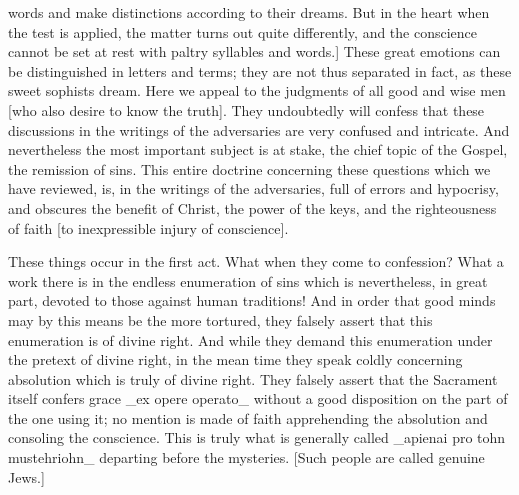 words and make distinctions according to their dreams.  But in the
heart when the test is applied, the matter turns out quite
differently, and the conscience cannot be set at rest with paltry
syllables and words.] These great emotions can be distinguished in
letters and terms; they are not thus separated in fact, as these
sweet sophists dream.  Here we appeal to the judgments of all good
and wise men [who also desire to know the truth].  They undoubtedly
will confess that these discussions in the writings of the
adversaries are very confused and intricate.  And nevertheless the
most important subject is at stake, the chief topic of the Gospel,
the remission of sins.  This entire doctrine concerning these
questions which we have reviewed, is, in the writings of the
adversaries, full of errors and hypocrisy, and obscures the benefit
of Christ, the power of the keys, and the righteousness of faith [to
inexpressible injury of conscience].

These things occur in the first act.  What when they come to
confession?  What a work there is in the endless enumeration of sins
which is nevertheless, in great part, devoted to those against human
traditions!  And in order that good minds may by this means be the
more tortured, they falsely assert that this enumeration is of divine
right.  And while they demand this enumeration under the pretext of
divine right, in the mean time they speak coldly concerning
absolution which is truly of divine right.  They falsely assert that
the Sacrament itself confers grace _ex opere operato_ without a good
disposition on the part of the one using it; no mention is made of
faith apprehending the absolution and consoling the conscience.  This
is truly what is generally called _apienai pro tohn mustehriohn_
departing before the mysteries.  [Such people are called genuine Jews.]

